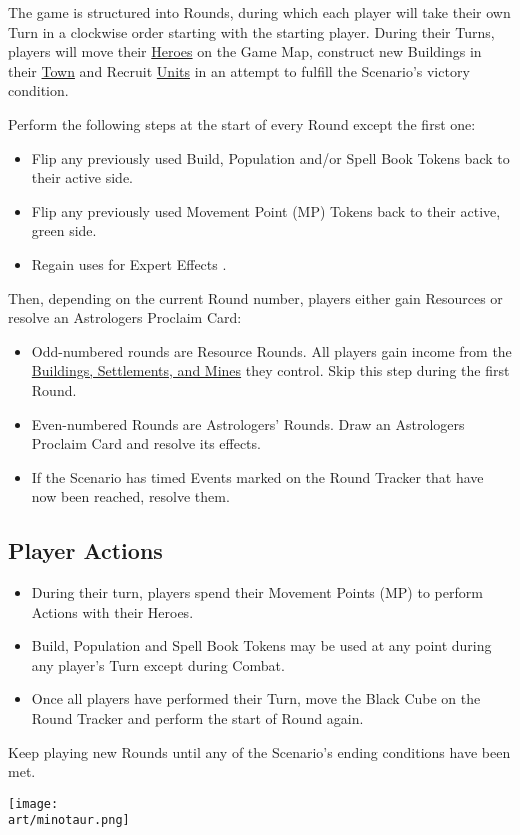 
\begin{multicols*}{2}

The game is structured into Rounds, during which each player will take their own Turn in a clockwise order starting with the starting player.
During their Turns, players will move their \hyperlink{Heroes}{Heroes} on the Game Map, construct new Buildings in their \hyperlink{Town}{Town} and Recruit \hyperlink{Units}{Units} in an attempt to fulfill the Scenario's victory condition.\par
Perform the following steps at the start of every Round except the first one:
\begin{itemize}
  \item Flip any previously used Build, Population and/or Spell Book Tokens back to their active side.
  \item Flip any previously used Movement Point (MP) Tokens back to their active, green side.
  \item Regain uses for Expert Effects .
\end{itemize}
Then, depending on the current Round number, players either gain Resources or resolve an Astrologers Proclaim Card:
\begin{itemize}
  \item Odd-numbered rounds are Resource Rounds.
    All players gain income from the \hyperlink{Mines}{Buildings, Settlements, and Mines} they control.
    Skip this step during the first Round.
  \item Even-numbered Rounds are Astrologers' Rounds.
    Draw an Astrologers Proclaim Card and resolve its effects.
  \item If the Scenario has timed Events marked on the Round Tracker that have now been reached, resolve them.
\end{itemize}
\subsection*{Player Actions}
\begin{itemize}
  \item During their turn, players spend their Movement Points (MP) to perform Actions with their Heroes.
  \item Build, Population and Spell Book Tokens may be used at any point during any player's Turn except during Combat.
  \item Once all players have performed their Turn, move the Black Cube on the Round Tracker and perform the start of Round again.
\end{itemize}
Keep playing new Rounds until any of the Scenario's ending conditions have been met.

\vfill
\hspace{2em}
\texttt{[image: \\art/minotaur.png]}
\vfill

\end{multicols*}
